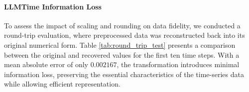 \documentclass{article}
\begin{document}
\paragraph{LLMTime Information Loss}
To assess the impact of scaling and rounding on data fidelity, we conducted a round-trip evaluation, where preprocessed data was reconstructed back into its original numerical form. Table \ref{tab:round_trip_test} presents a comparison between the original and recovered values for the first ten time steps. With a mean absolute error of only $0.002167$, the transformation introduces minimal information loss, preserving the essential characteristics of the time-series data while allowing efficient representation.
\end{document}
